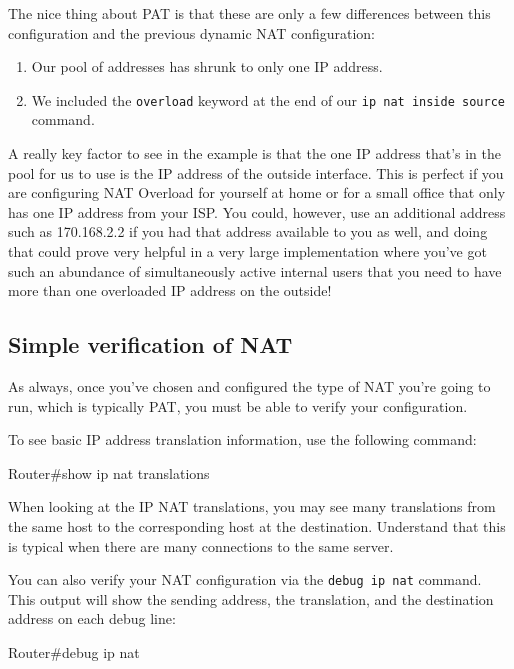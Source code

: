 The nice thing about
PAT is that these are only a few differences between this configuration
and the previous dynamic NAT configuration:

\begin{enumerate}
\item
  Our pool of addresses has shrunk to only one IP address.
\item
  We included the \texttt{overload} keyword at the end of our
  \texttt{ip\ nat\ inside\ source} command.
\end{enumerate}

A really key factor to see in the example is that the one IP address
that's in the pool for us to use is the IP address of the outside
interface. This is perfect if you are configuring NAT Overload for
yourself at home or for a small office that only has one IP address from
your ISP. You could, however, use an additional address such as
170.168.2.2 if you had that address available to you as well, and doing
that could prove very helpful in a very large implementation where
you've got such an abundance of simultaneously active internal users
that you need to have more than one overloaded IP address on the
outside!




\subsection{Simple verification of NAT}

As always, once you've chosen and configured the type of NAT you're
going to run, which is typically PAT, you must be able to verify your
configuration.

To see basic IP address translation information, use the following
command:

\begin{cli}
Router#show ip nat translations
\end{cli}

When looking at the IP NAT translations, you may see many translations
from the same host to the corresponding host at the destination.
Understand that this is typical when there are many connections to the
same server.

You can also verify your NAT configuration via the
\texttt{debug\ ip\ nat} command. This output will show the sending
address, the translation, and the destination address on each debug
line:

\begin{cli}
Router#debug ip nat
\end{cli}

